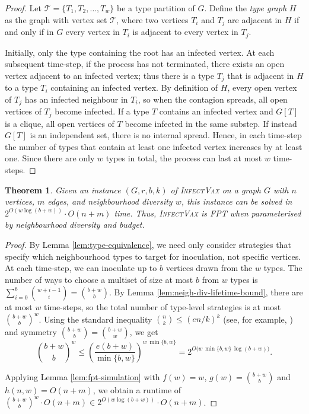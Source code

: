 \documentclass[unknownkeysallowed]{article}
\newtheorem{theorem}{Theorem}[section]
\theoremstyle{definition}\newtheorem{strategy}{Strategy}
\theoremstyle{definition}\newtheorem{notation}{Notation}[theorem]
\newcommand*{\IV}{\textup{\textsc{InfectVax}}\xspace}
\begin{document}
\begin{proof}
  Let $\mathcal{T} = \{T_1, T_2, \ldots, T_w\}$ be a type partition of $G$. Define the \emph{type graph} $H$ as the graph with vertex set $\mathcal{T}$, where two vertices $T_i$ and $T_j$ are adjacent in $H$ if and only if in $G$ every vertex in $T_i$ is adjacent to every vertex in $T_j$. 

  Initially, only the type containing the root has an infected vertex. At each subsequent time-step, if the process has not terminated, there exists an open vertex adjacent to an infected vertex; thus there is a type $T_j$ that is adjacent in $H$ to a type $T_i$ containing an infected vertex. By definition of $H$, every open vertex of $T_j$ has an infected neighbour in $T_i$, so when the contagion spreads, all open vertices of $T_j$ become infected. If a type $T$ contains an infected vertex and $G[T]$ is a clique, all open vertices of $T$ become infected in the same substep. If instead $G[T]$ is an independent set, there is no internal spread. Hence, in each time-step the number of types that contain at least one infected vertex increases by at least one. Since there are only $w$ types in total, the process can last at most $w$ time-steps.
\end{proof}

\begin{theorem}\label{thm:iv-nd-fpt}
  Given an instance $(G, r, b, k)$ of \IV on a graph $G$ with $n$ vertices, $m$ edges, and neighbourhood diversity $w$, this instance can be solved in $2^{O(w \log(b+w))} \cdot O(n+m)$ time. Thus, \IV is FPT when parameterised by neighbourhood diversity and budget.
\end{theorem}

\begin{proof}
  By Lemma \ref{lem:type-equivalence}, we need only consider strategies that specify which neighbourhood types to target for inoculation, not specific vertices. At each time-step, we can inoculate up to $b$ vertices drawn from the $w$ types. The number of ways to choose a multiset of size at most $b$ from $w$ types is $\sum_{i=0}^b \binom{w+i-1}{i} = \binom{b+w}{b}$. By Lemma \ref{lem:neigh-div-lifetime-bound}, there are at most $w$ time-steps, so the total number of type-level strategies is at most $\binom{b+w}{b}^w$. Using the standard inequality $\binom{n}{k} \leq (en/k)^k$ (see, for example, \cite{graham_1994}) and symmetry $\binom{b+w}{b}=\binom{b+w}{w}$, we get
  \[\binom{b+w}{b}^w \le \left(\frac{e(b+w)}{\min\{b,w\}}\right)^{w\,\min\{b,w\}} = 2^{O\big(w\,\min\{b,w\}\, \log(b+w)\big)}.\]

  Applying Lemma \ref{lem:fpt-simulation} with $f(w)=w$, $g(w)=\binom{b+w}{b}$ and $h(n,w)=O(n+m)$, we obtain a runtime of $\binom{b+w}{b}^w \cdot O(n+m) \in 2^{O(w \log(b+w))}\cdot O(n+m)$.
\end{proof}
\end{document}
